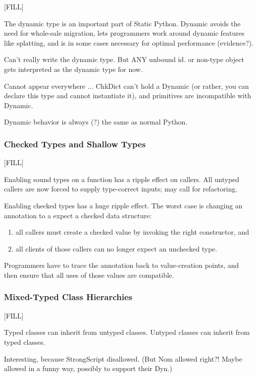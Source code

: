 \documentclass[english,cleveref,submission]{programming}
\begin{document}
[FILL]

The dynamic type is an important part of Static Python.
Dynamic avoids the need for whole-sale migration,
lets programmers work around dynamic features like splatting,
and is in some cases necessary for optimal performance (evidence?).

Can't really write the dynamic type.
But ANY unbound id. or non-type object gets interpreted as the dynamic type for now.

Cannot appear everywhere ... ChkDict can't hold a Dynamic (or rather, you can declare this type and cannot instantiate it),
and primitives are incompatible with Dynamic. 

Dynamic behavior is always (?) the same as normal Python.


\subsubsection{Checked Types and Shallow Types}

[FILL]

Enabling sound types on a function has a ripple effect on callers.
All untyped callers are now forced to supply type-correct inputs; may call for
refactoring.

Enabling checked types has a huge ripple effect.
The worst case is changing an annotation to a expect a checked data structure:
\begin{enumerate}
  \item all callers must create a checked value by invoking the right constructor, and
  \item all clients of those callers can no longer expect an unchecked type.
\end{enumerate}
Programmers have to trace the annotation back to value-creation points, and then
ensure that all uses of those values are compatible.


\subsubsection{Mixed-Typed Class Hierarchies}

[FILL]

Typed classes can inherit from untyped classes.
Untyped classes can inherit from typed classes.

Interesting, because StrongScript disallowed.
(But Nom allowed right?! Maybe allowed in a funny way, possibly to support their Dyn.)
\end{document}
